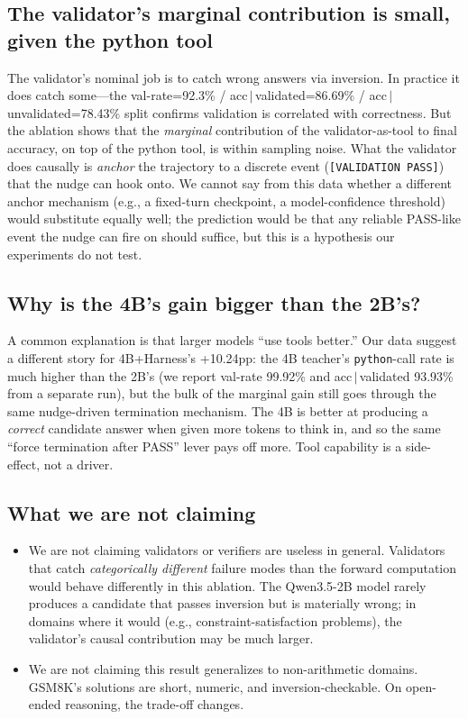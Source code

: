 \documentclass[10pt]{article}
\begin{document}
\subsection{The validator's marginal contribution is small, given the python tool}

The validator's nominal job is to catch wrong answers via inversion. In practice it does catch some---the val-rate=92.3\% / acc\,$|$\,validated=86.69\% / acc\,$|$\,unvalidated=78.43\% split confirms validation is correlated with correctness. But the ablation shows that the \emph{marginal} contribution of the validator-as-tool to final accuracy, on top of the python tool, is within sampling noise. What the validator does causally is \emph{anchor} the trajectory to a discrete event (\texttt{[VALIDATION PASS]}) that the nudge can hook onto. We cannot say from this data whether a different anchor mechanism (e.g., a fixed-turn checkpoint, a model-confidence threshold) would substitute equally well; the prediction would be that any reliable PASS-like event the nudge can fire on should suffice, but this is a hypothesis our experiments do not test.

\subsection{Why is the 4B's gain bigger than the 2B's?}

A common explanation is that larger models ``use tools better.'' Our data suggest a different story for 4B+Harness's +10.24pp: the 4B teacher's \texttt{python}-call rate is much higher than the 2B's (we report val-rate 99.92\% and acc\,$|$\,validated 93.93\% from a separate run), but the bulk of the marginal gain still goes through the same nudge-driven termination mechanism. The 4B is better at producing a \emph{correct} candidate answer when given more tokens to think in, and so the same ``force termination after PASS'' lever pays off more. Tool capability is a side-effect, not a driver.

\subsection{What we are not claiming}

\begin{itemize}
  \item We are not claiming validators or verifiers are useless in general. Validators that catch \emph{categorically different} failure modes than the forward computation would behave differently in this ablation. The Qwen3.5-2B model rarely produces a candidate that passes inversion but is materially wrong; in domains where it would (e.g., constraint-satisfaction problems), the validator's causal contribution may be much larger.
  \item We are not claiming this result generalizes to non-arithmetic domains. GSM8K's solutions are short, numeric, and inversion-checkable. On open-ended reasoning, the trade-off changes.
\end{itemize}
\end{document}
